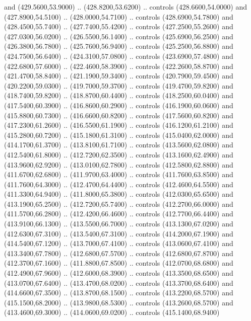 {\begin{scope}[y=0.80pt, x=0.80pt, yscale=-1, xscale=1, inner sep=0pt, outer sep=0pt, #1]
      and (429.5600,53.9000) .. (428.8200,53.6200) .. controls (428.6600,54.0000)
      and (427.8900,54.5100) .. (428.0000,54.7100) .. controls (428.6900,54.7800)
      and (428.4500,55.7400) .. (427.7400,55.4200) .. controls (427.2500,55.2600)
      and (427.0300,56.0200) .. (426.5500,56.1400) .. controls (425.6900,56.2500)
      and (426.3800,56.7800) .. (425.7600,56.9400) .. controls (425.2500,56.8800)
      and (424.7500,56.6400) .. (424.3100,57.0800) .. controls (423.6900,57.4800)
      and (422.6800,57.6000) .. (422.4600,58.3900) .. controls (422.2600,58.8700)
      and (421.4700,58.8400) .. (421.1900,59.3400) .. controls (420.7900,59.4500)
      and (420.2200,59.0300) .. (419.7000,59.3700) .. controls (419.4700,59.8200)
      and (418.7400,59.8200) .. (418.8700,60.4400) .. controls (418.2500,60.0400)
      and (417.5400,60.3900) .. (416.8600,60.2900) .. controls (416.1900,60.0600)
      and (415.8800,60.7300) .. (416.6600,60.8200) .. controls (417.5600,60.8200)
      and (417.2300,61.2600) .. (416.5500,61.1900) .. controls (416.1200,61.2100)
      and (415.2800,60.7200) .. (415.1800,61.3100) .. controls (415.0400,62.0000)
      and (414.1700,61.3700) .. (413.8100,61.7100) .. controls (413.5600,62.0800)
      and (412.5400,61.8000) .. (412.7200,62.3500) .. controls (413.1600,62.4900)
      and (413.9600,62.9200) .. (413.0100,62.7800) .. controls (412.5800,62.8800)
      and (411.6700,62.6800) .. (411.9700,63.4000) .. controls (411.7600,63.8500)
      and (411.7600,64.3000) .. (412.4700,64.4400) .. controls (412.4600,64.5500)
      and (411.3300,64.9400) .. (411.8000,65.3800) .. controls (412.0300,65.6500)
      and (413.1900,65.2500) .. (412.7200,65.7400) .. controls (412.2700,66.0000)
      and (411.5700,66.2800) .. (412.4200,66.4600) .. controls (412.7700,66.4400)
      and (413.9100,66.1300) .. (413.5500,66.7000) .. controls (413.1300,67.0200)
      and (412.6300,67.3100) .. (413.5400,67.3100) .. controls (414.2000,67.1900)
      and (414.5400,67.1200) .. (413.7000,67.4100) .. controls (413.0600,67.4100)
      and (413.3400,67.7800) .. (412.6800,67.5700) .. controls (412.6800,67.8700)
      and (412.3700,67.1600) .. (411.8800,67.8500) .. controls (412.0700,68.6800)
      and (412.4900,67.9600) .. (412.6000,68.3900) .. controls (413.3500,68.6500)
      and (413.0700,67.6400) .. (413.4700,68.0200) .. controls (413.3700,68.6400)
      and (414.6600,67.3500) .. (413.8700,68.1500) .. controls (413.2200,68.5700)
      and (415.1500,68.2000) .. (413.9800,68.5300) .. controls (413.2600,68.5700)
      and (413.4600,69.3000) .. (414.0600,69.0200) .. controls (415.1400,68.9400)

\end{scope}}

